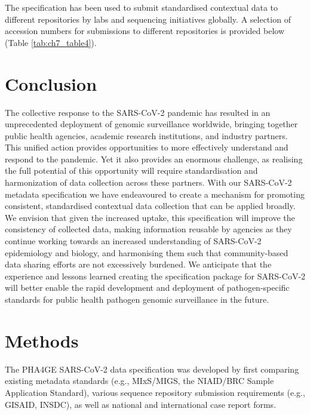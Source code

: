 The specification has been used to submit standardised contextual data to different repositories by labs and sequencing initiatives globally. A selection of accession numbers for submissions to different repositories is provided below (Table \ref{tab:ch7_table4}).



\section{Conclusion}

The collective response to the SARS-CoV-2 pandemic has resulted in an unprecedented deployment of genomic surveillance worldwide, bringing together public health agencies, academic research institutions, and industry partners. This unified action provides opportunities to more effectively understand and respond to the pandemic. Yet it also provides an enormous challenge, as realising the full potential of this opportunity will require standardisation and harmonization of data collection across these partners. With our SARS-CoV-2 metadata specification we have endeavoured to create a mechanism for promoting consistent, standardised contextual data collection that can be applied broadly. We envision that given the increased uptake, this specification will improve the consistency of collected data, making information reusable by agencies as they continue working towards an increased understanding of SARS-CoV-2 epidemiology and biology, and harmonising them such that community-based data sharing efforts are not excessively burdened. We anticipate that the experience and lessons learned creating the specification package for SARS-CoV-2 will better enable the rapid development and deployment of pathogen-specific standards for public health pathogen genomic surveillance in the future.

\section{Methods}

The PHA4GE SARS-CoV-2 data specification was developed by first comparing existing metadata standards (e.g., MIxS/MIGS, the NIAID/BRC Sample Application Standard), various sequence repository submission requirements (e.g., GISAID, INSDC), as well as national and international case report forms. 

